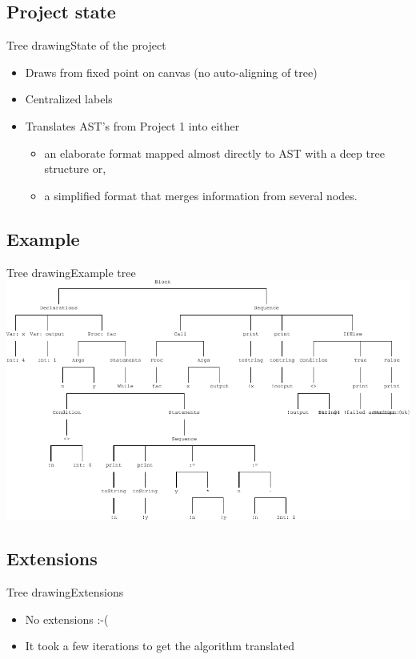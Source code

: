 \documentclass{beamer}
\begin{document}
\subsection{Project state}
\begin{frame}{Tree drawing}{State of the project}
  \begin{itemize}
  \item {
    Draws from fixed point on canvas (no auto-aligning of tree)
  }
  \item {
    Centralized labels
  }
  \item {
    Translates AST's from Project 1 into either
      \begin{itemize}
        \item an elaborate format mapped almost directly to AST with a deep tree structure or,
        \item a simplified format that merges information from several nodes.
     \end{itemize}       
  }
  \end{itemize}
\end{frame}


\subsection{Example}
\begin{frame}{Tree drawing}{Example tree}
\includegraphics[width=1.00\textwidth]{treeprint_example}
\end{frame}

\subsection{Extensions}
\begin{frame}{Tree drawing}{Extensions}
  \begin{itemize}
  \item {
    No extensions :-(
  }
  \pause
  \item {
    It took a few iterations to get the algorithm translated
  }
  \end{itemize}
\end{frame}
\end{document}
